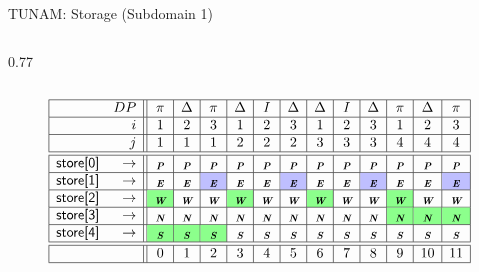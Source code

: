\documentclass[handout]{beamer}
\newcommand{\blue}{\cellcolor{blue!25}}  %
\newcommand{\green}{\cellcolor{green!45}}  %
\newcommand{\mbiu}[1]{_{\textbf{\em #1}}}
\begin{document}
\begin{frame}{TUNAM: Storage (Subdomain 1)}
\begin{columns}
\begin{column}{0.77\textwidth}
\end{column}
\end{columns}

\begin{tiny}
\[
\begin{array}{|rr||c|c|c|c|c|c|c|c|c|c|c|c|}
\hline
& DP &
 \pi & \Delta & \pi & \Delta & I & \Delta & \Delta & I & \Delta & \pi & \Delta & \pi \\
\hline
& i  &  
1 & 2 & 3 & 1 & 2 & 3 & 1 & 2 & 3 & 1 & 2 & 3  \\
\hline
& j  &  
1 & 1 & 1 & 2 & 2 & 2 & 3 & 3 & 3 & 4 & 4 & 4 \\
\hline
\hline
\textsf{store[0]} & \rightarrow &
\mbiu{P} & \mbiu{P} & \mbiu{P} & \mbiu{P} & \mbiu{P} & \mbiu{P} & \mbiu{P} & \mbiu{P} & \mbiu{P} & \mbiu{P} & \mbiu{P} & \mbiu{P} \\
\hline
\textsf{store[1]} & \rightarrow &
 \mbiu{E} & \mbiu{E} & \blue \textcolor{black}{\mbiu{E}} &
 \mbiu{E} & \mbiu{E} & \blue \textcolor{black}{\mbiu{E}} &
 \mbiu{E} & \mbiu{E} & \blue \textcolor{black}{\mbiu{E}} &
 \mbiu{E} & \mbiu{E} & \blue \textcolor{black}{\mbiu{E}}\\
\hline
\textsf{store[2]}  & \rightarrow &
\green \textcolor{black}{\mbiu{W}} & \mbiu{W} & \mbiu{W} & 
\green \textcolor{black}{\mbiu{W}} & \mbiu{W} & \mbiu{W} & 
\green \textcolor{black}{\mbiu{W}} & \mbiu{W} & \mbiu{W} & 
\green \textcolor{black}{\mbiu{W}} & \mbiu{W} & \mbiu{W}  \\
\hline
\textsf{store[3]} & \rightarrow &
 \mbiu{N} & \mbiu{N} & \mbiu{N} & \mbiu{N} & \mbiu{N} & \mbiu{N} & \mbiu{N} & \mbiu{N} & \mbiu{N} &
 \green \textcolor{black}{\mbiu{N}} & \green \textcolor{black}{\mbiu{N}} & \green \textcolor{black}{\mbiu{N}} \\
\hline
\textsf{store[4]} & \rightarrow &
\green \textcolor{black}{\mbiu{S}} & \green \textcolor{black}{\mbiu{S}} & \green \textcolor{black}{\mbiu{S}} &  
 \mbiu{S} & \mbiu{S} & \mbiu{S} & \mbiu{S} & \mbiu{S} & \mbiu{S} & \mbiu{S} & \mbiu{S} & \mbiu{S} \\
\hline
\hline
& & 0 & 1 & 2 & 3 & 4 & 5 & 6 & 7 & 8 & 9 & 10 & 11 \\
\hline
\end{array}
\]
\end{tiny}


\end{frame}
\end{document}

